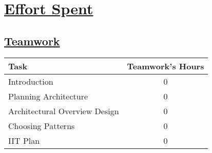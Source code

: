\section[Effort Spent]{\hyperlink{toc}{Effort Spent}}
\label{sec:effortSpent}

\subsection[Teamwork]{\hyperlink{toc}{Teamwork}}
\vspace{2mm}
\begin{center}
	\begin{tabular}{| l | c |}
		\hline
		\textbf{Task} & \textbf{Teamwork's Hours} \\ \hline
		Introduction & 0 \\ \hline
		Planning Architecture & 0 \\ \hline
		Architectural Overview Design & 0 \\ \hline
		Choosing Patterns & 0 \\ \hline
		IIT Plan & 0 \\
		\hline	
	\end{tabular}
\end{center}


